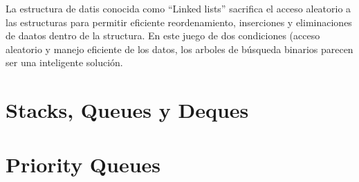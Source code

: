 \documentclass[11pt,letterpaper]{article}
\begin{document}
La estructura de datis conocida como ``Linked lists'' sacrifica el acceso aleatorio a las estructuras para permitir eficiente reordenamiento, inserciones y eliminaciones de daatos dentro de la structura. En este juego de dos condiciones (acceso aleatorio y manejo eficiente de los datos, los arboles de búsqueda binarios parecen ser una inteligente solución.



\section{Stacks, Queues y Deques}

\section{Priority Queues}
\end{document}
